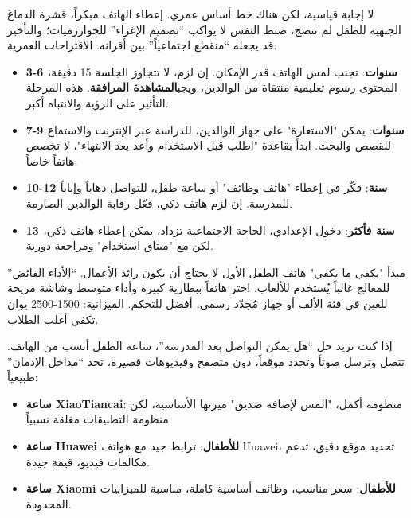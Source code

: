 


لا إجابة قياسية، لكن هناك خط أساس عمري. إعطاء الهاتف مبكراً، قشرة الدماغ الجبهية للطفل لم تنضج، ضبط النفس لا يواكب “تصميم الإغراء” للخوارزميات؛ والتأخير قد يجعله “منقطع اجتماعياً” بين أقرانه. الاقتراحات العمرية:

\begin{itemize}
  \item \textbf{3-6 سنوات}: تجنب لمس الهاتف قدر الإمكان. إن لزم، لا تتجاوز الجلسة 15 دقيقة، المحتوى رسوم تعليمية منتقاة من الوالدين، ويجب\textbf{المشاهدة المرافقة}. هذه المرحلة التأثير على الرؤية والانتباه أكبر.
  \item \textbf{7-9 سنوات}: يمكن "الاستعارة" على جهاز الوالدين، للدراسة عبر الإنترنت والاستماع للقصص والبحث. ابدأ بقاعدة "اطلب قبل الاستخدام وأعد بعد الانتهاء"، لا تخصص هاتفاً خاصاً.
  \item \textbf{10-12 سنة}: فكّر في إعطاء "هاتف وظائف" أو ساعة طفل، للتواصل ذهاباً وإياباً للمدرسة. إن لزم هاتف ذكي، فعّل رقابة الوالدين الصارمة.
  \item \textbf{13 سنة فأكثر}: دخول الإعدادي، الحاجة الاجتماعية تزداد، يمكن إعطاء هاتف ذكي، لكن مع "ميثاق استخدام" ومراجعة دورية.
\end{itemize}

\begin{tcbinfo}{مبدأ "يكفي ما يكفي"}
هاتف الطفل الأول لا يحتاج أن يكون رائد الأعمال. “الأداء الفائض” للمعالج غالباً يُستخدم للألعاب. اختر هاتفاً ببطارية كبيرة وأداء متوسط وشاشة مريحة للعين في فئة الألف أو جهاز مُجدّد رسمي، أفضل للتحكم. الميزانية: 1500-2500 يوان تكفي أغلب الطلاب.

\end{tcbinfo}


إذا كنت تريد حل “هل يمكن التواصل بعد المدرسة”، ساعة الطفل أنسب من الهاتف. تتصل وترسل صوتاً وتحدد موقعاً، دون متصفح وفيديوهات قصيرة، تحد “مداخل الإدمان” طبيعياً:

\begin{itemize}
  \item \textbf{ساعة XiaoTiancai}: منظومة أكمل، "المس لإضافة صديق" ميزتها الأساسية، لكن منظومة التطبيقات مغلقة نسبياً.
  \item \textbf{ساعة Huawei للأطفال}: ترابط جيد مع هواتف Huawei، تحديد موقع دقيق، تدعم مكالمات فيديو، قيمة جيدة.
  \item \textbf{ساعة Xiaomi للأطفال}: سعر مناسب، وظائف أساسية كاملة، مناسبة للميزانيات المحدودة.
\end{itemize}

